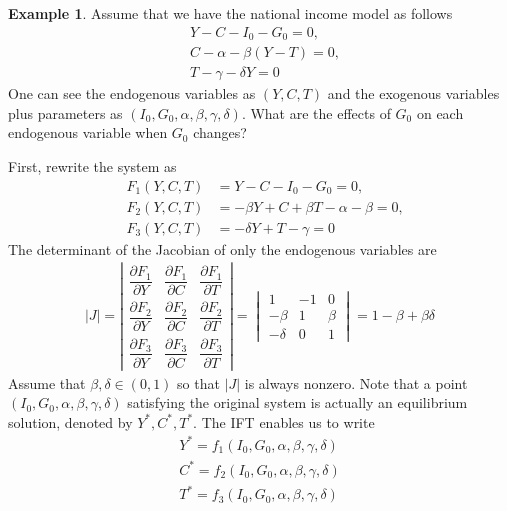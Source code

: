 \documentclass[10pt,a4paper]{book}
\theoremstyle{definition}\newtheorem{definition}{Definition}
\theoremstyle{definition}\newtheorem{fact}{Fact}
\theoremstyle{definition}\newtheorem{ex}{Ex.}
\theoremstyle{definition}\newtheorem{project}{Project}
\theoremstyle{definition}\newtheorem{problem}{Problem}
\theoremstyle{definition}\newtheorem{example}{Example}
\numberwithin{theorem}{chapter}
\numberwithin{corollary}{chapter}
\numberwithin{assumption}{chapter}
\numberwithin{definition}{chapter}
\numberwithin{prop}{chapter}
\numberwithin{notation}{chapter}
\numberwithin{problem}{chapter}
\numberwithin{example}{chapter}
\numberwithin{fact}{chapter}
\numberwithin{ex}{chapter}
\begin{document}
	\begin{example}
		Assume that we have the national income model as follows
		\begin{align*}
			&Y - C - I_0 - G_0 = 0, \\
			&C - \alpha -\beta (Y-T) = 0, \\
			&T - \gamma - \delta Y = 0
		\end{align*}
		One can see the endogenous variables as $(Y,C,T)$ and the exogenous variables plus parameters as $(I_0, G_0, \alpha,\beta,\gamma,\delta)$. What are the effects of $G_0$ on each endogenous variable when $G_0$ changes?
		
		First, rewrite the system as
		\begin{align*}
			&F_1(Y,C,T) & = Y - C - I_0 - G_0 = 0, \\
			&F_2(Y,C,T) & = - \beta Y + C +\beta T -\alpha - \beta = 0, \\
			&F_3(Y,C,T) & = - \delta Y + T - \gamma = 0
		\end{align*}
		The determinant of the Jacobian of only the endogenous variables are
		\begin{align*}
			|J| = \left| \begin{matrix}
				\dfrac{\partial F_1}{\partial Y} & \dfrac{\partial F_1}{\partial C} & \dfrac{\partial F_1}{\partial T} \\
				\dfrac{\partial F_2}{\partial Y} & \dfrac{\partial F_2}{\partial C} & \dfrac{\partial F_2}{\partial T}\\
				\dfrac{\partial F_3}{\partial Y} & \dfrac{\partial F_3}{\partial C} & \dfrac{\partial F_3}{\partial T}
			\end{matrix} \right|
			= \begin{vmatrix}
				1 & -1 & 0 \\
				-\beta & 1 & \beta \\
				-\delta & 0 & 1
			\end{vmatrix} = 1 - \beta + \beta\delta
		\end{align*}
		Assume that $\beta, \delta \in (0,1)$ so that $|J|$ is always nonzero. Note that a point $(I_0, G_0, \alpha,\beta,\gamma,\delta)$ satisfying the original system is actually an equilibrium solution, denoted by $Y^*, C^*, T^*$. The IFT enables us to write
		\begin{align*}
			Y^* = f_1 (I_0, G_0, \alpha,\beta,\gamma,\delta) \\
			C^* = f_2 (I_0, G_0, \alpha,\beta,\gamma,\delta) \\
			T^* = f_3 (I_0, G_0, \alpha,\beta,\gamma,\delta)

\end{align*}
\end{example}
\end{document}
